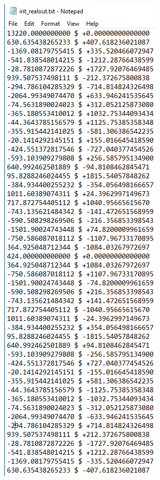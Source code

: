 \documentclass[12pt, titlepage]{article}
\begin{document}
\begin{figure}[h!]
\centering
\begin{minipage}[b]{0.5\textwidth}
 \includegraphics[width=\textwidth]{Output_Real}

\end{minipage}
\end{figure}
\end{document}
